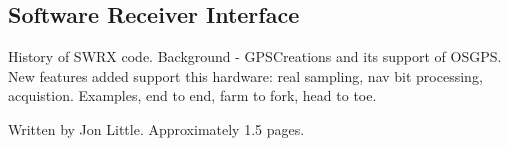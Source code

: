 \subsection*{Software Receiver Interface}

History of SWRX code. Background - GPSCreations and its support of OSGPS. New features added support this hardware: real sampling, nav bit processing, acquistion. Examples, end to end, farm to fork, head to toe.

Written by Jon Little. Approximately 1.5 pages.
